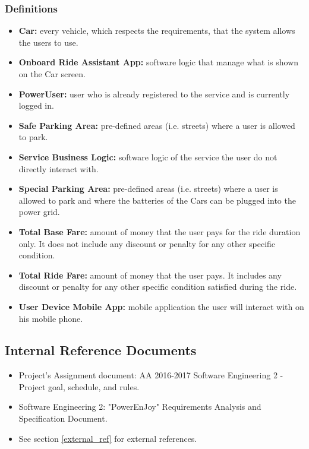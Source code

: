 \subsubsection{Definitions}
\begin{itemize}
    \item \textbf{Car:} every vehicle, which respects the requirements, that the system allows the users to use.
    \item \textbf{Onboard Ride Assistant App:} software logic that manage what is shown on the Car screen.
    \item\textbf{PowerUser:} user who is already registered to the service and is currently logged in.
    \item \textbf{Safe Parking Area:} pre-defined areas (i.e. streets) where a user is allowed to park.
    \item \textbf{Service Business Logic:} software logic of the service the user do not directly interact with.
    \item \textbf{Special Parking Area:} pre-defined areas (i.e. streets) where a user is allowed to park and where the batteries of the Cars can be plugged into the power grid.
    \item \textbf{Total Base Fare:} amount of money that the user pays for the ride duration only. It does not include any discount or penalty for any other specific condition.
    \item \textbf{Total Ride Fare:} amount of money that the user pays. It includes any discount or penalty for any other specific condition satisfied during the ride.
    \item \textbf{User Device Mobile App:} mobile application the user will interact with on his mobile phone.
\end{itemize}

\subsection{Internal Reference Documents}
\label{internal_ref}
\begin{itemize}
    \item Project’s Assignment document: AA 2016-2017 Software Engineering 2 - Project goal, schedule, and rules.
    \item Software Engineering 2: "PowerEnJoy" Requirements Analysis and Specification Document.
    \item See section \ref{external_ref} for external references.
\end{itemize}

